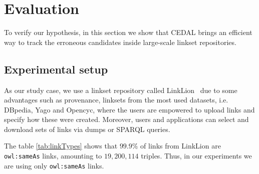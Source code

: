 
\section{Evaluation} \label{evaluation}

To verify our hypothesis, in this section we show that CEDAL brings an efficient way to track the erroneous candidates inside large-scale linkset repositories. 

\subsection{Experimental setup}
As our study case, we use a linkset repository called LinkLion~\cite{nentwig2014linklion} due to some advantages such as provenance, linksets from the most used datasets, i.e. DBpedia, Yago and Opencyc, where the users are empowered to upload links and specify how these were created. Moreover, users and applications can select and download sets of links via dumps or SPARQL queries. 

The table \ref{tab:linkTypes} shows that $99.9 \%$ of links from LinkLion are \texttt{owl:sameAs} links, amounting to $19,200,114$ triples. Thus, in our experiments we are using only \texttt{owl:sameAs} links. 

